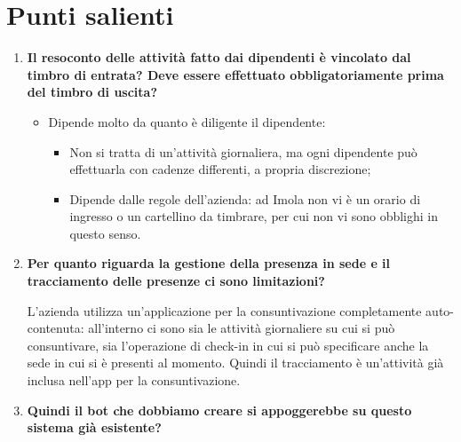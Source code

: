 \documentclass[11pt]{article}
\begin{document}
	\section{Punti salienti}
		\begin{enumerate}
			\item \textbf{Il resoconto delle attività fatto dai dipendenti è vincolato dal timbro di entrata? Deve
			essere effettuato obbligatoriamente prima del timbro di uscita?}
			
			\medskip
			
			\begin{itemize}
				\item Dipende molto da quanto è diligente il dipendente:
				\begin{itemize}
					\item Non si tratta di un'attività giornaliera, ma ogni dipendente può effettuarla con cadenze differenti,
					a propria discrezione;
					\item Dipende dalle regole dell'azienda: ad Imola non vi è un orario di ingresso o un cartellino
					da timbrare, per cui non vi sono obblighi in questo senso.
				\end{itemize}
			\end{itemize}

			\bigskip
			
			\item \textbf{Per quanto riguarda la gestione della presenza in sede e il tracciamento delle presenze ci sono
			limitazioni?}
			
			\medskip 
			
			L'azienda utilizza un'applicazione per la consuntivazione completamente auto-contenuta:
			all'interno ci sono sia le attività giornaliere su cui si può consuntivare, sia l'operazione di check-in in cui si può specificare anche la sede in cui si è presenti al momento. Quindi il tracciamento è un'attività già inclusa nell'app per la consuntivazione.
			
			\bigskip 
			
			\item \textbf{Quindi il bot che dobbiamo creare si appoggerebbe su questo sistema già esistente?}
			
			\medskip
			

\end{enumerate}
\end{document}
